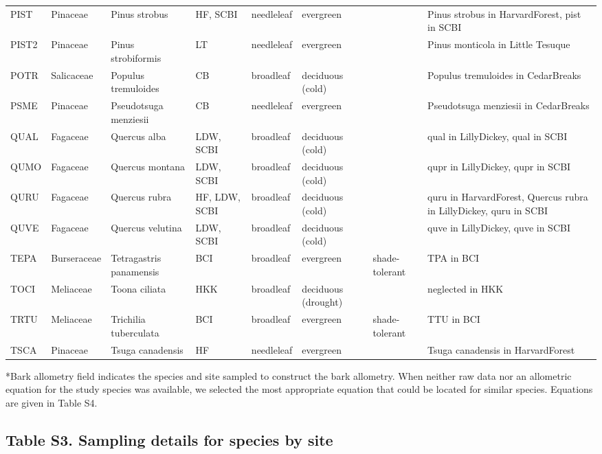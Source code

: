 \documentclass[
]{article}
\begin{document}
\begin{table}[!h]
{\begin{tabular}{lllllll>{\raggedright\arraybackslash}p{5cm}}
\addlinespace
PIST & Pinaceae & Pinus strobus & HF, SCBI & needleleaf & evergreen &  & Pinus strobus in HarvardForest, pist in SCBI\\
\addlinespace
PIST2 & Pinaceae & Pinus strobiformis & LT & needleleaf & evergreen &  & Pinus monticola in Little Tesuque\\
\addlinespace
POTR & Salicaceae & Populus tremuloides & CB & broadleaf & deciduous (cold) &  & Populus tremuloides in CedarBreaks\\
\addlinespace
PSME & Pinaceae & Pseudotsuga menziesii & CB & needleleaf & evergreen &  & Pseudotsuga menziesii in CedarBreaks\\
\addlinespace
QUAL & Fagaceae & Quercus alba & LDW, SCBI & broadleaf & deciduous (cold) &  & qual in LillyDickey, qual in SCBI\\
\addlinespace
QUMO & Fagaceae & Quercus montana & LDW, SCBI & broadleaf & deciduous (cold) &  & qupr in LillyDickey, qupr in SCBI\\
\addlinespace
QURU & Fagaceae & Quercus rubra & HF, LDW, SCBI & broadleaf & deciduous (cold) &  & quru in HarvardForest, Quercus rubra in LillyDickey, quru in SCBI\\
\addlinespace
QUVE & Fagaceae & Quercus velutina & LDW, SCBI & broadleaf & deciduous (cold) &  & quve in LillyDickey, quve in SCBI\\
\addlinespace
TEPA & Burseraceae & Tetragastris panamensis & BCI & broadleaf & evergreen & shade-tolerant & TPA in BCI\\
\addlinespace
TOCI & Meliaceae & Toona ciliata & HKK & broadleaf & deciduous (drought) &  & neglected in HKK\\
\addlinespace
TRTU & Meliaceae & Trichilia tuberculata & BCI & broadleaf & evergreen & shade-tolerant & TTU in BCI\\
\addlinespace
TSCA & Pinaceae & Tsuga canadensis & HF & needleleaf & evergreen &  & Tsuga canadensis in HarvardForest\\
\bottomrule
\end{tabular}}
\end{table}

*Bark allometry field indicates the species and site sampled to
construct the bark allometry. When neither raw data nor an allometric
equation for the study species was available, we selected the most
appropriate equation that could be located for similar species.
Equations are given in Table S4.

\newpage

\hypertarget{table-s3.-sampling-details-for-species-by-site}{%
\subsection{Table S3. Sampling details for species by
site}\label{table-s3.-sampling-details-for-species-by-site}}
\end{document}
